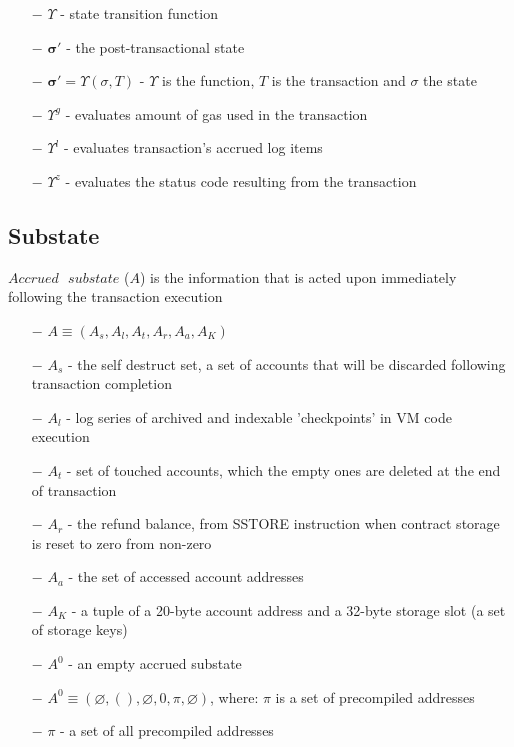\documentclass{article}
\begin{document}
\begin{itemize}
    \item[$-$] $\Upsilon$ - state transition function
    \item[$-$] $\bm{\sigma}'$ - the post-transactional state 
    \item[$-$] $\bm{\sigma}' = \Upsilon(\sigma, T)$ - $\Upsilon$ is the function, $T$ is the transaction and $\sigma$ the state
    \item[$-$] $\Upsilon^g$ - evaluates amount of gas used in the transaction
    \item[$-$] $\Upsilon^l$ - evaluates transaction's accrued log items
    \item[$-$] $\Upsilon^z$ - evaluates the status code resulting from the transaction
\end{itemize}

\subsection{Substate}

$Accrued \text{ } substate$ ($A$) is the information that is acted upon immediately following the transaction execution

\begin{itemize}
    \item[$-$] $A \equiv (A_s, A_l, A_t, A_r, A_a, A_K)$
    \item[$-$] $A_s$ - the self destruct set, a set of accounts that will be discarded following transaction completion
    \item[$-$] $A_l$ - log series of archived and indexable 'checkpoints' in VM code execution
    \item[$-$] $A_t$ - set of touched accounts, which the empty ones are deleted at the end of transaction
    \item[$-$] $A_r$ - the refund balance, from SSTORE instruction when contract storage is reset to zero from non-zero
    \item[$-$] $A_a$ - the set of accessed account addresses
    \item[$-$] $A_K$ - a tuple of a 20-byte account address and a 32-byte storage slot (a set of storage keys) 
    \item[$-$] $A^0$ - an empty accrued substate
    \item[$-$] $A^0 \equiv (\varnothing, (), \varnothing, 0, \pi, \varnothing)$, where: $\pi$ is a set of precompiled addresses
    \item[$-$] $\pi$ - a set of all precompiled addresses
\end{itemize}
\end{document}
